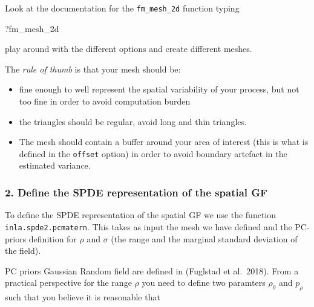 \documentclass[
  letterpaper,
  DIV=11,
  numbers=noendperiod]{scrartcl}
\newenvironment{Shaded}{\begin{snugshade}}{\end{snugshade}}
\newcommand{\NormalTok}[1]{\textcolor[rgb]{0.00,0.23,0.31}{#1}}
\providecommand{\tightlist}{%
  \setlength{\itemsep}{0pt}\setlength{\parskip}{0pt}}
\begin{document}
\begin{tcolorbox}[enhanced jigsaw, arc=.35mm, bottomrule=.15mm, bottomtitle=1mm, breakable, colback=white, colbacktitle=quarto-callout-warning-color!10!white, colframe=quarto-callout-warning-color-frame, coltitle=black, left=2mm, leftrule=.75mm, opacityback=0, opacitybacktitle=0.6, rightrule=.15mm, title={Task}, titlerule=0mm, toprule=.15mm, toptitle=1mm]

Look at the documentation for the \texttt{fm\_mesh\_2d} function typing

\begin{Shaded}
\begin{Highlighting}[]
\NormalTok{?fm\_mesh\_2d}
\end{Highlighting}
\end{Shaded}

play around with the different options and create different meshes.

The \emph{rule of thumb} is that your mesh should be:

\begin{itemize}
\tightlist
\item
  fine enough to well represent the spatial variability of your process,
  but not too fine in order to avoid computation burden
\item
  the triangles should be regular, avoid long and thin triangles.
\item
  The mesh should contain a buffer around your area of interest (this is
  what is defined in the \texttt{offset} option) in order to avoid
  boundary artefact in the estimated variance.
\end{itemize}

\end{tcolorbox}

\subsubsection{2. Define the SPDE representation of the spatial
GF}\label{define-the-spde-representation-of-the-spatial-gf}

To define the SPDE representation of the spatial GF we use the function
\texttt{inla.spde2.pcmatern}. This takes as input the mesh we have
defined and the PC-priors definition for \(\rho\) and \(\sigma\) (the
range and the marginal standard deviation of the field).

PC priors Gaussian Random field are defined in (Fuglstad et al.~2018).
From a practical perspective for the range \(\rho\) you need to define
two paramters \(\rho_0\) and \(p_{\rho}\) such that you believe it is
reasonable that
\end{document}
